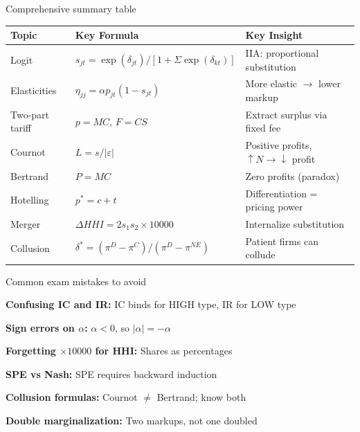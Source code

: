 \documentclass[notes,11pt, aspectratio=169]{beamer}
\newenvironment{wideenumerate}{\enumerate\addtolength{\itemsep}{10pt}}{\endenumerate}
\begin{document}
\begin{frame}{Comprehensive summary table}
	\begin{center}
		\scriptsize
		\begin{tabular}{|p{2.5cm}|p{4.5cm}|p{4.5cm}|}
			\hline
			\textbf{Topic} & \textbf{Key Formula} & \textbf{Key Insight} \\
			\hline
			Logit & $s_{jt} = \exp(\delta_{jt})/[1+\Sigma\exp(\delta_{kt})]$ & IIA: proportional substitution \\
			\hline
			Elasticities & $\eta_{jj} = \alpha p_{jt}(1-s_{jt})$ & More elastic $\rightarrow$ lower markup \\
			\hline
			Two-part tariff & $p=MC$, $F=CS$ & Extract surplus via fixed fee \\
			\hline
			Cournot & $L = s/|\varepsilon|$ & Positive profits, $\uparrow N \rightarrow \downarrow$ profit \\
			\hline
			Bertrand & $P = MC$ & Zero profits (paradox) \\
			\hline
			Hotelling & $p^* = c + t$ & Differentiation = pricing power \\
			\hline
			Merger & $\Delta HHI = 2s_1 s_2 \times 10000$ & Internalize substitution \\
			\hline
			Collusion & $\delta^* = (\pi^D-\pi^C)/(\pi^D-\pi^{NE})$ & Patient firms can collude \\
			\hline
		\end{tabular}
	\end{center}
\end{frame}

\begin{frame}{Common exam mistakes to avoid}
	\begin{wideenumerate}
		\item \textbf{Confusing IC and IR:} IC binds for HIGH type, IR for LOW type
		\item \textbf{Sign errors on $\alpha$:} $\alpha < 0$, so $|\alpha| = -\alpha$
		\item \textbf{Forgetting $\times 10000$ for HHI:} Shares as percentages
		\item \textbf{SPE vs Nash:} SPE requires backward induction
		\item \textbf{Collusion formulas:} Cournot $\neq$ Bertrand; know both
		\item \textbf{Double marginalization:} Two markups, not one doubled
	\end{wideenumerate}
\end{frame}
\end{document}
